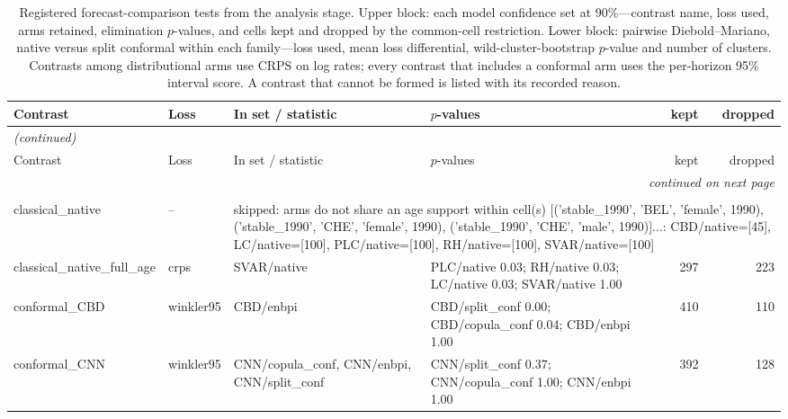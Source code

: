 {\footnotesize\setlength{\tabcolsep}{2pt}
\begin{longtable}{@{}llp{3.2cm}p{5.2cm}rr@{}}
\caption{Registered forecast-comparison tests from the analysis stage. Upper block: each model confidence set at 90\%---contrast name, loss used, arms retained, elimination $p$-values, and cells kept and dropped by the common-cell restriction. Lower block: pairwise Diebold--Mariano, native versus split conformal within each family---loss used, mean loss differential, wild-cluster-bootstrap $p$-value and number of clusters. Contrasts among distributional arms use CRPS on log rates; every contrast that includes a conformal arm uses the per-horizon 95\% interval score. A contrast that cannot be formed is listed with its recorded reason.}\label{tab:dm-mcs} \\
\toprule
Contrast & Loss & In set / statistic & $p$-values & kept & dropped \\
\midrule
\endfirsthead
\multicolumn{6}{l}{\emph{(continued)}} \\
\toprule
Contrast & Loss & In set / statistic & $p$-values & kept & dropped \\
\midrule
\endhead
\midrule \multicolumn{6}{r}{\emph{continued on next page}} \\
\endfoot
\bottomrule
\endlastfoot
\multicolumn{6}{l}{\textbf{stable regime} -- model confidence sets ($1-\alpha$ = 0.90)} \\
\midrule
classical\_native & -- & \multicolumn{4}{p{9.6cm}}{skipped: arms do not share an age support within cell(s) [('stable\_1990', 'BEL', 'female', 1990), ('stable\_1990', 'CHE', 'female', 1990), ('stable\_1990', 'CHE', 'male', 1990)]...: CBD/native=[45], LC/native=[100], PLC/native=[100], RH/native=[100], SVAR/native=[100]} \\
classical\_native\_full\_age & crps & SVAR/native & PLC/native 0.03; RH/native 0.03; LC/native 0.03; SVAR/native 1.00 & 297 & 223 \\
conformal\_CBD & winkler95 & CBD/enbpi & CBD/split\_conf 0.00; CBD/copula\_conf 0.04; CBD/enbpi 1.00 & 410 & 110 \\
conformal\_CNN & winkler95 & CNN/copula\_conf, CNN/enbpi, CNN/split\_conf & CNN/split\_conf 0.37; CNN/copula\_conf 1.00; CNN/enbpi 1.00 & 392 & 128 \\

\end{longtable}}
